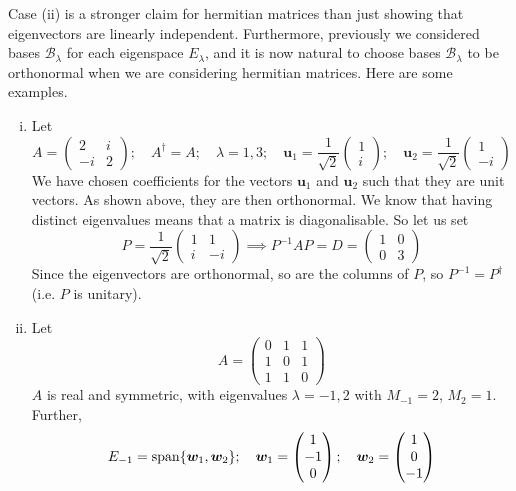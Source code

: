 \documentclass{article}
\begin{document}
	Case (ii) is a stronger claim for hermitian matrices than just showing that eigenvectors are linearly independent. Furthermore, previously we considered bases $\mathcal B_\lambda$ for each eigenspace $E_\lambda$, and it is now natural to choose bases $\mathcal B_\lambda$ to be orthonormal when we are considering hermitian matrices. Here are some examples.
	\begin{enumerate}[(i)]
		\item Let
		\[ A = \begin{pmatrix}
			2 & i \\ -i & 2
		\end{pmatrix};\quad A^\dagger = A;\quad \lambda = 1, 3;\quad\bm u_1 = \frac{1}{\sqrt{2}} \begin{pmatrix}
			1\\i
		\end{pmatrix};\quad\bm u_2 = \frac{1}{\sqrt{2}} \begin{pmatrix}
			1\\-i
		\end{pmatrix} \]
		We have chosen coefficients for the vectors $\bm u_1$ and $\bm u_2$ such that they are unit vectors. As shown above, they are then orthonormal. We know that having distinct eigenvalues means that a matrix is diagonalisable. So let us set
		\[ P =  \frac{1}{\sqrt{2}} \begin{pmatrix}
			1 & 1 \\ i & -i
		\end{pmatrix} \implies P^{-1}AP = D = \begin{pmatrix}
			1 & 0 \\ 0 & 3
		\end{pmatrix} \]
		Since the eigenvectors are orthonormal, so are the columns of $P$, so $P^{-1} = P^\dagger$ (i.e. $P$ is unitary).
		\item Let
		\[ A = \begin{pmatrix}
			0 & 1 & 1 \\ 1 & 0 & 1 \\ 1 & 1 & 0
		\end{pmatrix} \]
		$A$ is real and symmetric, with eigenvalues $\lambda = -1, 2$ with $M_{-1} = 2$, $M_2 = 1$. Further,
		\[ E_{-1} = \operatorname{span} \{ \bm w_1, \bm w_2 \};\quad \bm w_1 = \begin{pmatrix}
			1 \\ -1 \\ 0
		\end{pmatrix};\quad \bm w_2 = \begin{pmatrix}
			1 \\ 0 \\ -1

\end{pmatrix}\]
\end{enumerate}
\end{document}

